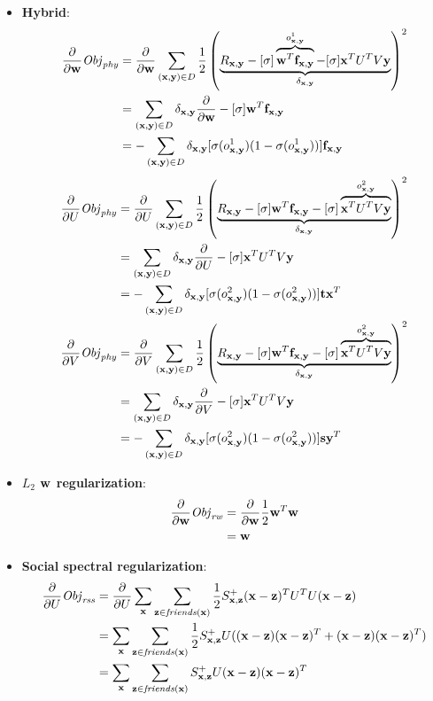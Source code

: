 \begin{itemize}
\item {\bf Hybrid}:
\begin{align*}
\frac{\partial}{\partial \w} \Obj_\phy & = \frac{\partial}{\partial \w} \sum_{(\x,\y) \in D} \frac{1}{2} \left( \underbrace{R_{\x,\y} - [\sigma] \overbrace{\w^T \f_{\x,\y}}^{o^1_{\x,\y}} - [\sigma] \x^T U^T V\y}_{\delta_{\x,\y}} \right)^2 \\
& = \sum_{(\x,\y) \in D} \delta_{\x,\y} \frac{\partial}{\partial \w} - [\sigma] \w^T \f_{\x,\y} \\
& = - \sum_{(\x,\y) \in D} \delta_{\x,\y} [\sigma(o^1_{\x,\y}) (1 - \sigma(o^1_{\x,\y}))] \f_{\x,\y} 
\end{align*}
\begin{align*}
\frac{\partial}{\partial U} \Obj_\phy & = \frac{\partial}{\partial U} \sum_{(\x,\y) \in D} \frac{1}{2} \left( \underbrace{R_{\x,\y} - [\sigma] \w^T \f_{\x,\y} - [\sigma] \overbrace{\x^T U^T V\y}^{o^2_{\x,\y}}}_{\delta_{\x,\y}}\right)^2 \\
& = \sum_{(\x,\y) \in D} \delta_{\x,\y} \frac{\partial}{\partial U} - [\sigma] \x^T U^T V\y \\
& = - \sum_{(\x,\y) \in D} \delta_{\x,\y} [\sigma(o^2_{\x,\y}) (1 - \sigma(o^2_{\x,\y}))] \t \x^T\\
\frac{\partial}{\partial V} \Obj_\phy & = \frac{\partial}{\partial V} \sum_{(\x,\y) \in D} \frac{1}{2} \left( \underbrace{R_{\x,\y} - [\sigma] \w^T \f_{\x,\y} - [\sigma] \overbrace{\x^T U^T V\y}^{o^2_{\x,\y}}}_{\delta_{\x,\y}}\right)^2 \\
& = \sum_{(\x,\y) \in D}  \delta_{\x,\y} \frac{\partial}{\partial V} - [\sigma] \x^T U^T V\y \\
& = - \sum_{(\x,\y) \in D}  \delta_{\x,\y} [\sigma(o^2_{\x,\y}) (1 - \sigma(o^2_{\x,\y}))] \s \y^T \\
\end{align*}

\item {\bf $L_2$ $\w$ regularization}:
\begin{align*}
\frac{\partial}{\partial \w} \Obj_\rw & = \frac{\partial}{\partial \w} \frac{1}{2} \w^T \w\\
& = \w
\end{align*}

\item {\bf Social spectral regularization}:
\begin{align*}
\frac{\partial}{\partial U} \Obj_\rss & = \frac{\partial}{\partial U} \sum_{\x} \sum_{\z \in \mathit{friends}(\x)} \frac{1}{2} S^+_{\x,\z} (\x - \z)^T U^T U (\x - \z) \\
& = \sum_{\x} \sum_{\z \in \mathit{friends}(\x)} \frac{1}{2} S^+_{\x,\z} U ((\x - \z)(\x - \z)^T + (\x - \z)(\x - \z)^T)\\
& = \sum_{\x} \sum_{\z \in \mathit{friends}(\x)} S^+_{\x,\z} U (\x - \z)(\x - \z)^T
\end{align*}
\end{itemize}
